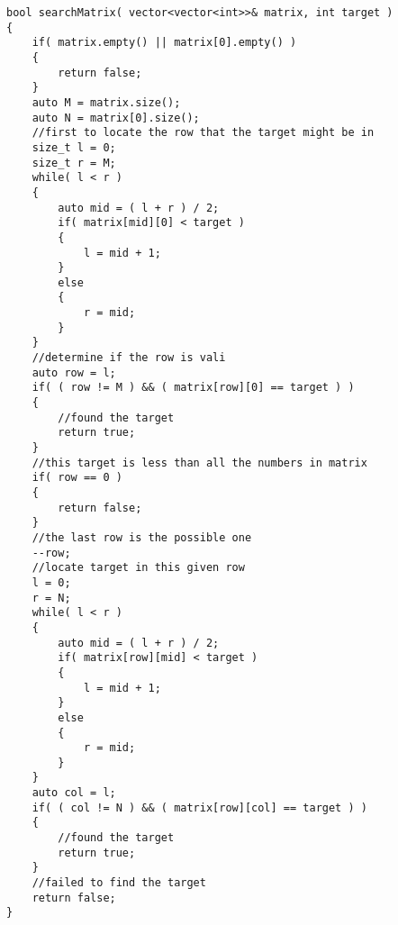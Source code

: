 \setcounter{lstlisting}{0}
\begin{lstlisting}[style=customc, caption={Binary Search}]
bool searchMatrix( vector<vector<int>>& matrix, int target )
{
    if( matrix.empty() || matrix[0].empty() )
    {
        return false;
    }
    auto M = matrix.size();
    auto N = matrix[0].size();
    //first to locate the row that the target might be in
    size_t l = 0;
    size_t r = M;
    while( l < r )
    {
        auto mid = ( l + r ) / 2;
        if( matrix[mid][0] < target )
        {
            l = mid + 1;
        }
        else
        {
            r = mid;
        }
    }
    //determine if the row is vali
    auto row = l;
    if( ( row != M ) && ( matrix[row][0] == target ) )
    {
        //found the target
        return true;
    }
    //this target is less than all the numbers in matrix
    if( row == 0 )
    {
        return false;
    }
    //the last row is the possible one
    --row;
    //locate target in this given row
    l = 0;
    r = N;
    while( l < r )
    {
        auto mid = ( l + r ) / 2;
        if( matrix[row][mid] < target )
        {
            l = mid + 1;
        }
        else
        {
            r = mid;
        }
    }
    auto col = l;
    if( ( col != N ) && ( matrix[row][col] == target ) )
    {
        //found the target
        return true;
    }
    //failed to find the target
    return false;
}
\end{lstlisting}